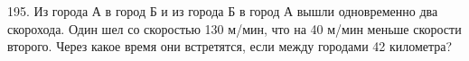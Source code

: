 195. Из города А в город Б и из города Б в город А вышли одновременно два скорохода. Один шел со скоростью 130 м/мин, что на 40 м/мин меньше скорости второго. Через какое время они встретятся, если между городами 42 километра?\\

